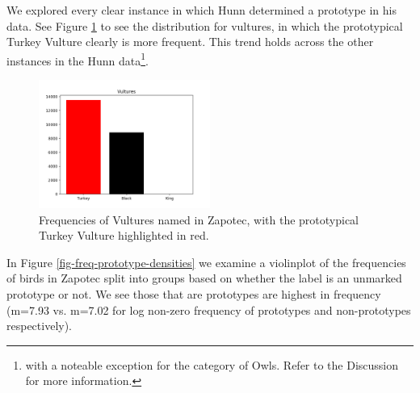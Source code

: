 \documentclass[10pt,letterpaper]{article}
\begin{document}

We explored every clear instance in which Hunn determined a prototype in his data. See Figure \ref{fig-freq-prototype-vultures} to see the distribution for vultures, in which the prototypical Turkey Vulture clearly is more frequent. This trend holds across the other instances in the Hunn data\footnote{with a noteable exception for the category of Owls. Refer to the Discussion for more information.}.

\begin{figure}[h!]
  \begin{center}
    \includegraphics[width=0.5\textwidth]{./figures/prototype-barplot-vultures.png}
        \caption{Frequencies of Vultures named in Zapotec, with the prototypical Turkey Vulture highlighted in red.}
        \label{fig-freq-prototype-vultures}
  \end{center}
\end{figure}



In Figure \ref{fig-freq-prototype-densities} we examine a violinplot of the frequencies of birds in Zapotec split into groups based on whether the label is an unmarked prototype or not. We see those that are prototypes are highest in frequency (m=7.93 vs. m=7.02 for log non-zero frequency of prototypes and non-prototypes respectively).
\end{document}
